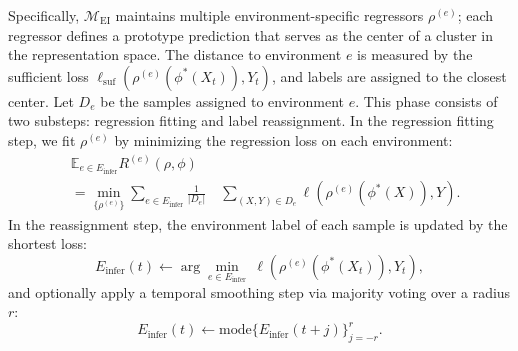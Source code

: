 ﻿\documentclass[journal]{IEEEtran}
\begin{document}
Specifically, $\mathcal{M}_{\mathrm{EI}}$ maintains multiple environment-specific regressors $\rho^{(e)}$; each regressor defines a prototype prediction that serves as the center of a cluster in the representation space. The distance to environment $e$ is measured by the sufficient loss $\ell_{\mathrm{suf}}(\rho^{(e)}(\phi^{*}(X_t)),Y_t)$, and labels are assigned to the closest center. Let $D_e$ be the samples assigned to environment $e$. This phase consists of two substeps: regression fitting and label reassignment. In the regression fitting step, we fit $\rho^{(e)}$ by minimizing the regression loss on each environment:
\begin{equation}
\begin{aligned}
&\mathbb{E}_{e\in E_{\mathrm{infer}}}R^{(e)}(\rho,\phi) \\
&= \min_{\{\rho^{(e)}\}}\sum_{e\in E_{\mathrm{infer}}}\frac{1}{|D_e|}
\quad \sum_{(X,Y)\in D_e}\ell\!\left(\rho^{(e)}(\phi^{*}(X)),Y\right).
\end{aligned}
\end{equation}
In the reassignment step, the environment label of each sample is updated by the shortest loss:
\begin{equation}
E_{\mathrm{infer}}(t)\leftarrow \arg\min_{e\in E_{\mathrm{infer}}}\ \ell\!\left(\rho^{(e)}(\phi^{*}(X_t)),Y_t\right),
\end{equation}
and optionally apply a temporal smoothing step via majority voting over a radius $r$:
\begin{equation}
E_{\mathrm{infer}}(t)\leftarrow \mathrm{mode}\{E_{\mathrm{infer}}(t+j)\}_{j=-r}^{r}.
\end{equation}
\end{document}
